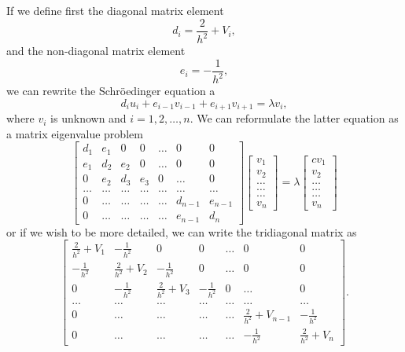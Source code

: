 \documentclass[graybox,envcountchap,sectrefs]{svmult}
\begin{document}
If we  define first the diagonal matrix element
\[
   d_i=\frac{2}{h^2}+V_i,
\]
and the non-diagonal matrix element
\[
   e_i=-\frac{1}{h^2},
\]
we can rewrite the Schr\"oedinger equation a
\[
d_iu_i+e_{i-1}v_{i-1}+e_{i+1}v_{i+1}  = \lambda v_i,
\]
where $v_i$ is unknown and $i=1,2,\dots, n$. We can reformulate the
latter equation as a matrix eigenvalue problem
\[
    \begin{bmatrix} d_1 & e_1 & 0   & 0    & \dots  &0     & 0 \\
                                e_1 & d_2 & e_2 & 0    & \dots  &0     &0 \\
                                0   & e_2 & d_3 & e_3  &0       &\dots & 0\\
                                \dots  & \dots & \dots & \dots  &\dots      &\dots & \dots\\
                                0   & \dots & \dots & \dots  &\dots       &d_{n-1} & e_{n-1}\\
                                0   & \dots & \dots & \dots  &\dots       &e_{n-1} & d_{n}
             \end{bmatrix}      \begin{bmatrix} v_{1} \\
                                                              v_{2} \\
                                                              \dots\\ \dots\\ \dots\\
                                                              v_{n}
             \end{bmatrix}=\lambda \begin{bmatrix}{c} v_{1} \\
                                                              v_{2} \\
                                                              \dots\\ \dots\\ \dots\\
                                                              v_{n}
             \end{bmatrix}
\]
or if we wish to be more detailed, we can write the tridiagonal matrix as
\[
    \begin{bmatrix} \frac{2}{h^2}+V_1 & -\frac{1}{h^2} & 0   & 0    & \dots  &0     & 0 \\
                                -\frac{1}{h^2} & \frac{2}{h^2}+V_2 & -\frac{1}{h^2} & 0    & \dots  &0     &0 \\
                                0   & -\frac{1}{h^2} & \frac{2}{h^2}+V_3 & -\frac{1}{h^2}  &0       &\dots & 0\\
                                \dots  & \dots & \dots & \dots  &\dots      &\dots & \dots\\
                                0   & \dots & \dots & \dots  &\dots       &\frac{2}{h^2}+V_{n-1} & -\frac{1}{h^2}\\
                                0   & \dots & \dots & \dots  &\dots       &-\frac{1}{h^2} & \frac{2}{h^2}+V_{n}
             \end{bmatrix}.
\]
\end{document}

